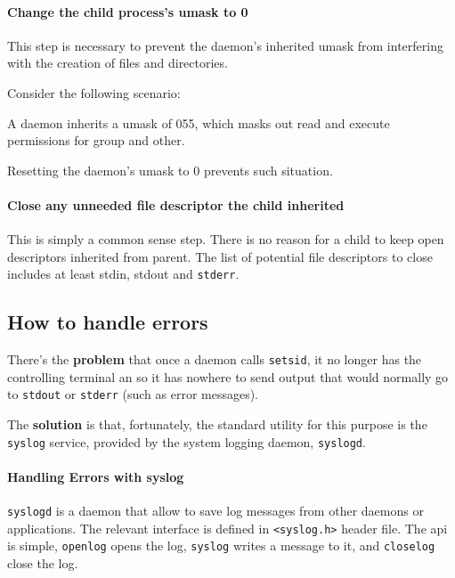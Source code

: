 \paragraph{\textbf{Change the child process's umask to 0}}

This step is necessary to prevent the daemon's inherited umask from interfering with the creation of files and directories.

Consider the following scenario:
\begin{item-c}
\item A daemon inherits a umask of 055, which masks out read and execute permissions for group and other. 
\item Resetting the daemon’s umask to 0 prevents such situation.
\end{item-c}
%

%

\paragraph{\textbf{Close any unneeded file descriptor the child inherited}}
%
This is simply a common sense step. There is no reason for a child to keep open descriptors inherited from parent.
The list of potential file descriptors to close includes at least stdin, stdout and \texttt{stderr}.
%

%

\subsection{How to handle errors}
%
There's the \textbf{problem} that once a daemon calls \texttt{setsid}, it no longer has the controlling terminal an so it has nowhere to send output that would normally go to \texttt{stdout} or \texttt{stderr} (such as error messages).

The \textbf{solution} is that, fortunately, the standard utility for this purpose is the \texttt{syslog} service, provided by the system logging daemon, \texttt{syslogd}.

\paragraph{\textbf{Handling Errors with syslog}}
%
\texttt{syslogd} is a daemon that allow to save log messages from other daemons or applications.
The relevant interface is defined in \texttt{<syslog.h>} header file.
The \gls{api} is simple, \texttt{openlog} opens the log, \texttt{syslog} writes a message to it, and
\texttt{closelog} close the log.


